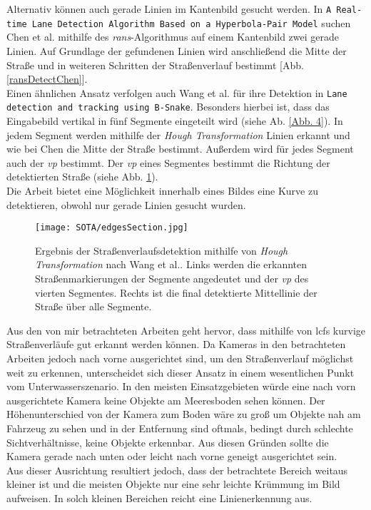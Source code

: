 Alternativ können auch gerade Linien im Kantenbild gesucht werden. In \texttt{A Real-time Lane Detection Algorithm Based on a Hyperbola-Pair Model} \cite{chen2006real} suchen Chen et al. mithilfe des \textit{\gls{rans}}-Algorithmus auf einem Kantenbild zwei gerade Linien. Auf Grundlage der gefundenen Linien wird anschließend die Mitte der Straße und in weiteren Schritten der Straßenverlauf bestimmt [Abb. \ref{ransDetectChen}].\\

Einen ähnlichen Ansatz verfolgen auch Wang et al. für ihre Detektion in \texttt{Lane detection and tracking using B-Snake}\cite{wang2004lane}. Besonders hierbei ist, dass das Eingabebild vertikal in fünf Segmente eingeteilt wird (siehe Ab. \ref{Abb. 4}). In jedem Segment werden mithilfe der \textit{Hough Transformation} Linien erkannt und wie bei Chen die Mitte der Straße bestimmt. Außerdem wird für jedes Segment auch der \textit{\gls{vp}} bestimmt. Der \textit{\gls{vp}} eines Segmentes bestimmt die Richtung der detektierten Straße (siehe Abb. \ref{detHough}).\\
Die Arbeit bietet eine Möglichkeit innerhalb eines Bildes eine Kurve zu detektieren, obwohl nur gerade Linien gesucht wurden.
\begin{figure}[H]
\centering
\texttt{[image: SOTA/edgesSection.jpg]}
\caption[Detektion eines Straßenverlaufs mit der \textit{Hough Transformation}]{Ergebnis der Straßenverlaufsdetektion mithilfe von \textit{Hough Transformation} nach Wang et al.. Links werden die erkannten Straßenmarkierungen der Segmente angedeutet und der \textit{\gls{vp}} des vierten Segmentes. Rechts ist die final detektierte Mittellinie der Straße über alle Segmente.}
\label{detHough}
\end{figure}
Aus den von mir betrachteten Arbeiten geht hervor, dass mithilfe von \glspl{lcf} kurvige Straßenverläufe gut erkannt werden können. Da Kameras in den betrachteten Arbeiten jedoch nach vorne ausgerichtet sind, um den Straßenverlauf möglichst weit zu erkennen, unterscheidet sich dieser Ansatz in einem wesentlichen Punkt vom Unterwasserszenario. In den meisten Einsatzgebieten würde eine nach vorn ausgerichtete Kamera keine Objekte am Meeresboden sehen können. Der Höhenunterschied von der Kamera zum Boden wäre zu groß um Objekte nah am Fahrzeug zu sehen und in der Entfernung sind oftmals, bedingt durch schlechte Sichtverhältnisse, keine Objekte erkennbar. Aus diesen Gründen sollte die Kamera gerade nach unten oder leicht nach vorne geneigt ausgerichtet sein.\\
Aus dieser Ausrichtung resultiert jedoch, dass der betrachtete Bereich weitaus kleiner ist und die meisten Objekte nur eine sehr leichte Krümmung im Bild aufweisen. In solch kleinen Bereichen reicht eine Linienerkennung aus.

